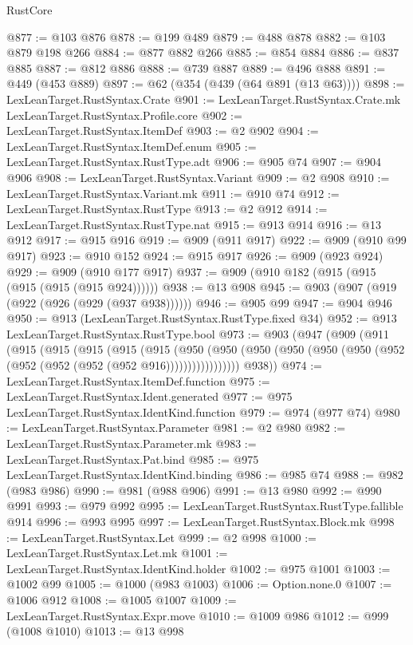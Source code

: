 \begin{lexlean}{RustCore}
\begin{coremodule}
@877 := @103 @876
@878 := @199 @489
@879 := @488 @878
@882 := @103 @879 @198 @266
@884 := @877 @882 @266
@885 := @854 @884
@886 := @837 @885
@887 := @812 @886
@888 := @739 @887
@889 := @496 @888
@891 := @449 (@453 @889)
@897 := @62 (@354 (@439 (@64 @891 (@13 @63))))
@898 := LexLeanTarget.RustSyntax.Crate
@901 := LexLeanTarget.RustSyntax.Crate.mk LexLeanTarget.RustSyntax.Profile.core
@902 := LexLeanTarget.RustSyntax.ItemDef
@903 := @2 @902
@904 := LexLeanTarget.RustSyntax.ItemDef.enum
@905 := LexLeanTarget.RustSyntax.RustType.adt
@906 := @905 @74
@907 := @904 @906
@908 := LexLeanTarget.RustSyntax.Variant
@909 := @2 @908
@910 := LexLeanTarget.RustSyntax.Variant.mk
@911 := @910 @74
@912 := LexLeanTarget.RustSyntax.RustType
@913 := @2 @912
@914 := LexLeanTarget.RustSyntax.RustType.nat
@915 := @913 @914
@916 := @13 @912
@917 := @915 @916
@919 := @909 (@911 @917)
@922 := @909 (@910 @99 @917)
@923 := @910 @152
@924 := @915 @917
@926 := @909 (@923 @924)
@929 := @909 (@910 @177 @917)
@937 := @909 (@910 @182 (@915 (@915 (@915 (@915 (@915 @924))))))
@938 := @13 @908
@945 := @903 (@907 (@919 (@922 (@926 (@929 (@937 @938))))))
@946 := @905 @99
@947 := @904 @946
@950 := @913 (LexLeanTarget.RustSyntax.RustType.fixed @34)
@952 := @913 LexLeanTarget.RustSyntax.RustType.bool
@973 := @903
    (@947
      (@909
        (@911
          (@915
            (@915
              (@915
                (@915
                  (@915
                    (@950
                      (@950
                        (@950 (@950 (@950 (@950 (@952 (@952 (@952 (@952 (@952 @916)))))))))))))))))
        @938))
@974 := LexLeanTarget.RustSyntax.ItemDef.function
@975 := LexLeanTarget.RustSyntax.Ident.generated
@977 := @975 LexLeanTarget.RustSyntax.IdentKind.function
@979 := @974 (@977 @74)
@980 := LexLeanTarget.RustSyntax.Parameter
@981 := @2 @980
@982 := LexLeanTarget.RustSyntax.Parameter.mk
@983 := LexLeanTarget.RustSyntax.Pat.bind
@985 := @975 LexLeanTarget.RustSyntax.IdentKind.binding
@986 := @985 @74
@988 := @982 (@983 @986)
@990 := @981 (@988 @906)
@991 := @13 @980
@992 := @990 @991
@993 := @979 @992
@995 := LexLeanTarget.RustSyntax.RustType.fallible @914
@996 := @993 @995
@997 := LexLeanTarget.RustSyntax.Block.mk
@998 := LexLeanTarget.RustSyntax.Let
@999 := @2 @998
@1000 := LexLeanTarget.RustSyntax.Let.mk
@1001 := LexLeanTarget.RustSyntax.IdentKind.holder
@1002 := @975 @1001
@1003 := @1002 @99
@1005 := @1000 (@983 @1003)
@1006 := Option.none.{0}
@1007 := @1006 @912
@1008 := @1005 @1007
@1009 := LexLeanTarget.RustSyntax.Expr.move
@1010 := @1009 @986
@1012 := @999 (@1008 @1010)
@1013 := @13 @998

\end{coremodule}
\end{lexlean}

